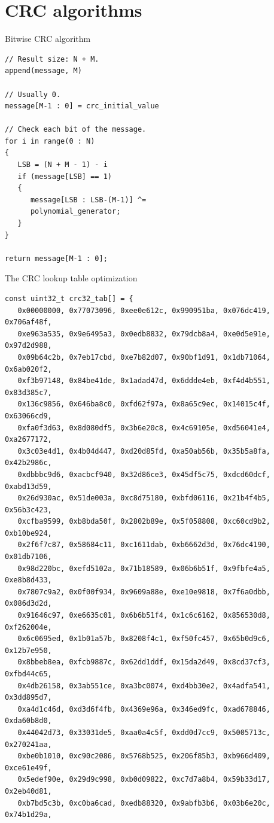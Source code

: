 \documentclass[10pt]{beamer}
\begin{document}
\section[CRC algorithms]{CRC algorithms}

\begin{frame}[fragile]{Bitwise CRC algorithm}
\begin{verbatim}
// Result size: N + M.
append(message, M)

// Usually 0.
message[M-1 : 0] = crc_initial_value

// Check each bit of the message.
for i in range(0 : N) 
{
   LSB = (N + M - 1) - i
   if (message[LSB] == 1)
   {
      message[LSB : LSB-(M-1)] ^= 
      polynomial_generator;
   }
}

return message[M-1 : 0];
\end{verbatim}
\end{frame}


\begin{frame}[fragile]{The CRC lookup table optimization}
\begin{scriptsize}
\begin{verbatim}
const uint32_t crc32_tab[] = {
   0x00000000, 0x77073096, 0xee0e612c, 0x990951ba, 0x076dc419, 0x706af48f,
   0xe963a535, 0x9e6495a3, 0x0edb8832, 0x79dcb8a4, 0xe0d5e91e, 0x97d2d988,
   0x09b64c2b, 0x7eb17cbd, 0xe7b82d07, 0x90bf1d91, 0x1db71064, 0x6ab020f2,
   0xf3b97148, 0x84be41de, 0x1adad47d, 0x6ddde4eb, 0xf4d4b551, 0x83d385c7,
   0x136c9856, 0x646ba8c0, 0xfd62f97a, 0x8a65c9ec, 0x14015c4f, 0x63066cd9,
   0xfa0f3d63, 0x8d080df5, 0x3b6e20c8, 0x4c69105e, 0xd56041e4, 0xa2677172,
   0x3c03e4d1, 0x4b04d447, 0xd20d85fd, 0xa50ab56b, 0x35b5a8fa, 0x42b2986c,
   0xdbbbc9d6, 0xacbcf940, 0x32d86ce3, 0x45df5c75, 0xdcd60dcf, 0xabd13d59,
   0x26d930ac, 0x51de003a, 0xc8d75180, 0xbfd06116, 0x21b4f4b5, 0x56b3c423,
   0xcfba9599, 0xb8bda50f, 0x2802b89e, 0x5f058808, 0xc60cd9b2, 0xb10be924,
   0x2f6f7c87, 0x58684c11, 0xc1611dab, 0xb6662d3d, 0x76dc4190, 0x01db7106,
   0x98d220bc, 0xefd5102a, 0x71b18589, 0x06b6b51f, 0x9fbfe4a5, 0xe8b8d433,
   0x7807c9a2, 0x0f00f934, 0x9609a88e, 0xe10e9818, 0x7f6a0dbb, 0x086d3d2d,
   0x91646c97, 0xe6635c01, 0x6b6b51f4, 0x1c6c6162, 0x856530d8, 0xf262004e,
   0x6c0695ed, 0x1b01a57b, 0x8208f4c1, 0xf50fc457, 0x65b0d9c6, 0x12b7e950,
   0x8bbeb8ea, 0xfcb9887c, 0x62dd1ddf, 0x15da2d49, 0x8cd37cf3, 0xfbd44c65,
   0x4db26158, 0x3ab551ce, 0xa3bc0074, 0xd4bb30e2, 0x4adfa541, 0x3dd895d7,
   0xa4d1c46d, 0xd3d6f4fb, 0x4369e96a, 0x346ed9fc, 0xad678846, 0xda60b8d0,
   0x44042d73, 0x33031de5, 0xaa0a4c5f, 0xdd0d7cc9, 0x5005713c, 0x270241aa,
   0xbe0b1010, 0xc90c2086, 0x5768b525, 0x206f85b3, 0xb966d409, 0xce61e49f,
   0x5edef90e, 0x29d9c998, 0xb0d09822, 0xc7d7a8b4, 0x59b33d17, 0x2eb40d81,
   0xb7bd5c3b, 0xc0ba6cad, 0xedb88320, 0x9abfb3b6, 0x03b6e20c, 0x74b1d29a,
\end{verbatim}
\end{scriptsize}
\end{frame}
\end{document}
